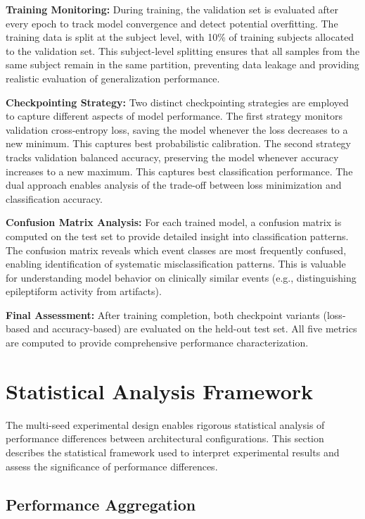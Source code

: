 \textbf{Training Monitoring:} During training, the validation set is evaluated after every epoch to track model convergence and detect potential overfitting. The training data is split at the subject level, with 10\% of training subjects allocated to the validation set. This subject-level splitting ensures that all samples from the same subject remain in the same partition, preventing data leakage and providing realistic evaluation of generalization performance.

\textbf{Checkpointing Strategy:} Two distinct checkpointing strategies are employed to capture different aspects of model performance. The first strategy monitors validation cross-entropy loss, saving the model whenever the loss decreases to a new minimum. This captures best probabilistic calibration. The second strategy tracks validation balanced accuracy, preserving the model whenever accuracy increases to a new maximum. This captures best classification performance. The dual approach enables analysis of the trade-off between loss minimization and classification accuracy.

\textbf{Confusion Matrix Analysis:} For each trained model, a confusion matrix is computed on the test set to provide detailed insight into classification patterns. The confusion matrix reveals which event classes are most frequently confused, enabling identification of systematic misclassification patterns. This is valuable for understanding model behavior on clinically similar events (e.g., distinguishing epileptiform activity from artifacts).

\textbf{Final Assessment:} After training completion, both checkpoint variants (loss-based and accuracy-based) are evaluated on the held-out test set. All five metrics are computed to provide comprehensive performance characterization.


\section{Statistical Analysis Framework}
\label{sec:statistical_analysis}

The multi-seed experimental design enables rigorous statistical analysis of performance differences between architectural configurations. This section describes the statistical framework used to interpret experimental results and assess the significance of performance differences.

\subsection{Performance Aggregation}
\label{sec:aggregation}

